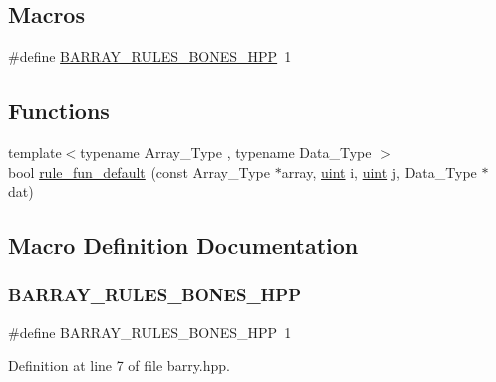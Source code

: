 \subsection*{Macros}
\begin{DoxyCompactItemize}
\item 
\#define \hyperlink{barry_8hpp_a334efcd2fa320e5b31d9a9971180d06f}{B\+A\+R\+R\+A\+Y\+\_\+\+R\+U\+L\+E\+S\+\_\+\+B\+O\+N\+E\+S\+\_\+\+H\+PP}~1
\end{DoxyCompactItemize}
\subsection*{Functions}
\begin{DoxyCompactItemize}
\item 
{\footnotesize template$<$typename Array\+\_\+\+Type , typename Data\+\_\+\+Type $>$ }\\bool \hyperlink{rules-bones_8hpp_aaeb0527576529579dd4cb51cb3ba73e0}{rule\+\_\+fun\+\_\+default} (const Array\+\_\+\+Type $\ast$array, \hyperlink{typedefs_8hpp_a91ad9478d81a7aaf2593e8d9c3d06a14}{uint} i, \hyperlink{typedefs_8hpp_a91ad9478d81a7aaf2593e8d9c3d06a14}{uint} j, Data\+\_\+\+Type $\ast$dat)
\end{DoxyCompactItemize}


\subsection{Macro Definition Documentation}
\mbox{\label{barry_8hpp_a334efcd2fa320e5b31d9a9971180d06f}} 
\subsubsection{\texorpdfstring{B\+A\+R\+R\+A\+Y\+\_\+\+R\+U\+L\+E\+S\+\_\+\+B\+O\+N\+E\+S\+\_\+\+H\+PP}{BARRAY\_RULES\_BONES\_HPP}}
{\footnotesize\ttfamily \#define B\+A\+R\+R\+A\+Y\+\_\+\+R\+U\+L\+E\+S\+\_\+\+B\+O\+N\+E\+S\+\_\+\+H\+PP~1}



Definition at line 7 of file barry.\+hpp.



